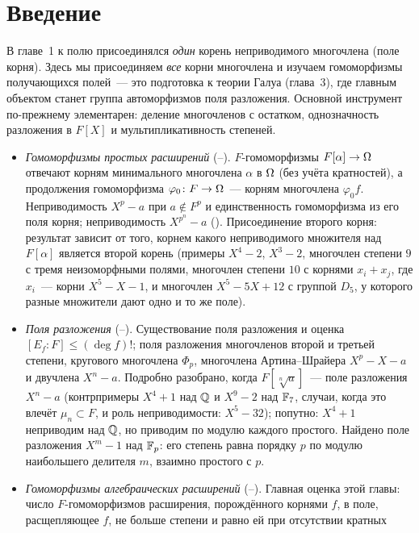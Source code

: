 \section*{Введение}

В главе~1 к полю присоединялся \emph{один} корень неприводимого многочлена (поле корня). Здесь мы присоединяем
\emph{все} корни многочлена и изучаем гомоморфизмы получающихся полей~--- это подготовка к теории Галуа (глава~3), где
главным объектом станет группа автоморфизмов поля разложения. Основной инструмент по-прежнему элементарен: деление
многочленов с остатком, однозначность разложения в $F[X]$ и мультипликативность степеней.

\begin{itemize}[leftmargin=*]
\item \emph{Гомоморфизмы простых расширений} (--). $F$-гомоморфизмы $F[\alpha]\to\Omega$ отвечают корням
минимального многочлена $\alpha$ в $\Omega$ (без учёта кратностей), а продолжения гомоморфизма $\varphi_0\colon F\to\Omega$~---
корням многочлена $\varphi_0f$. Неприводимость $X^p-a$ при $a\notin F^p$ и единственность гомоморфизма из его поля корня;
неприводимость $X^{p^n}-a$ ().
Присоединение второго корня: результат зависит от того, корнем какого неприводимого множителя над $F[\alpha]$ является
второй корень (примеры $X^4-2$, $X^3-2$, многочлен степени $9$ с тремя неизоморфными полями, многочлен степени $10$ с
корнями $x_i+x_j$, где $x_i$~--- корни $X^5-X-1$, и многочлен $X^5-5X+12$ с группой $D_5$, у которого разные множители
дают одно и то же поле).
\item \emph{Поля разложения} (--). Существование поля разложения и оценка $[E_f:F]\le(\deg f)!$; поля
разложения многочленов второй и третьей степени, кругового многочлена $\Phi_p$, многочлена Артина--Шрайера $X^p-X-a$ и
двучлена $X^n-a$. Подробно разобрано, когда $F[\sqrt[n]a]$~--- поле разложения $X^n-a$ (контрпримеры $X^4+1$ над $\mathbb Q$ и
$X^9-2$ над $\mathbb F_7$, случаи, когда это влечёт $\mu_n\subset F$, и роль неприводимости: $X^5-32$); попутно: $X^4+1$
неприводим над $\mathbb Q$, но приводим по модулю каждого простого. Найдено поле разложения $X^m-1$ над $\mathbb F_p$: его
степень равна порядку $p$ по модулю наибольшего делителя $m$, взаимно простого с $p$.
\item \emph{Гомоморфизмы алгебраических расширений} (--). Главная оценка этой главы: число $F$-гомоморфизмов
расширения, порождённого корнями $f$, в поле, расщепляющее $f$, не больше степени и равно ей при отсутствии кратных

\end{itemize}

